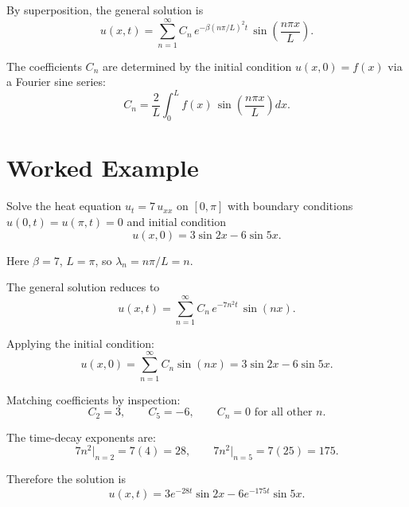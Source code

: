 By superposition, the general solution is
\[
  \boxed{u(x,t) = \sum_{n=1}^{\infty} C_n\, e^{-\beta\left(n\pi/L\right)^2 t}\,\sin\!\left(\frac{n\pi x}{L}\right).}
\]

The coefficients $C_n$ are determined by the initial condition $u(x,0) = f(x)$ via a Fourier sine series:
\[
  C_n = \frac{2}{L}\int_0^L f(x)\,\sin\!\left(\frac{n\pi x}{L}\right)dx.
\]

\section{Worked Example}

\begin{example}
Solve the heat equation $u_t = 7\,u_{xx}$ on $[0,\pi]$ with boundary conditions $u(0,t)=u(\pi,t)=0$ and initial condition
\[
  u(x,0) = 3\sin 2x - 6\sin 5x.
\]

\begin{solution}
Here $\beta = 7$, $L = \pi$, so $\lambda_n = n\pi/L = n$.

The general solution reduces to
\[
  u(x,t) = \sum_{n=1}^{\infty} C_n\, e^{-7n^2 t}\,\sin(nx).
\]

Applying the initial condition:
\[
  u(x,0) = \sum_{n=1}^{\infty} C_n \sin(nx) = 3\sin 2x - 6\sin 5x.
\]

Matching coefficients by inspection:
\[
  C_2 = 3, \qquad C_5 = -6, \qquad C_n = 0 \text{ for all other } n.
\]

The time-decay exponents are:
\[
  7n^2\big|_{n=2} = 7(4) = 28, \qquad 7n^2\big|_{n=5} = 7(25) = 175.
\]

Therefore the solution is
\[
  \boxed{u(x,t) = 3e^{-28t}\sin 2x - 6e^{-175t}\sin 5x.}
\]
\end{solution}
\end{example}

